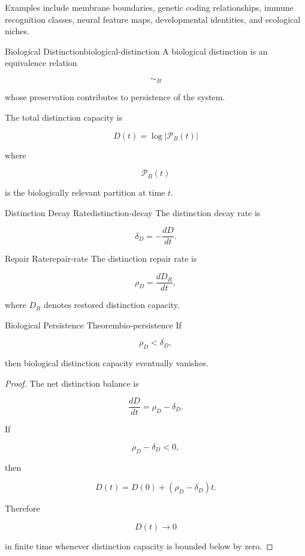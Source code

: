 \documentclass[12pt,twoside,openright]{book}
\begin{document}
Examples include membrane boundaries, genetic coding
relationships, immune recognition classes, neural feature
maps, developmental identities, and ecological niches.

\begin{definition}{Biological Distinction}{biological-distinction}
A biological distinction is an equivalence relation

\[
\sim_B
\]

whose preservation contributes to persistence of the
system.
\end{definition}

The total distinction capacity is

\[
D(t)
=
\log |\mathcal P_B(t)|
\]

where

\[
\mathcal P_B(t)
\]

is the biologically relevant partition at time \(t\).

\begin{definition}{Distinction Decay Rate}{distinction-decay}
The distinction decay rate is

\[
\delta_D
=
-\frac{dD}{dt}.
\]
\end{definition}

\begin{definition}{Repair Rate}{repair-rate}
The distinction repair rate is

\[
\rho_D
=
\frac{dD_R}{dt},
\]

where \(D_R\) denotes restored distinction capacity.
\end{definition}

\begin{theorem}{Biological Persistence Theorem}{bio-persistence}
If

\[
\rho_D
<
\delta_D,
\]

then biological distinction capacity eventually vanishes.
\end{theorem}

\begin{proof}
The net distinction balance is

\[
\frac{dD}{dt}
=
\rho_D-\delta_D.
\]

If

\[
\rho_D-\delta_D<0,
\]

then

\[
D(t)
=
D(0)
+
(\rho_D-\delta_D)t.
\]

Therefore

\[
D(t)\rightarrow0
\]

in finite time whenever distinction capacity is bounded
below by zero.
\end{proof}
\end{document}
